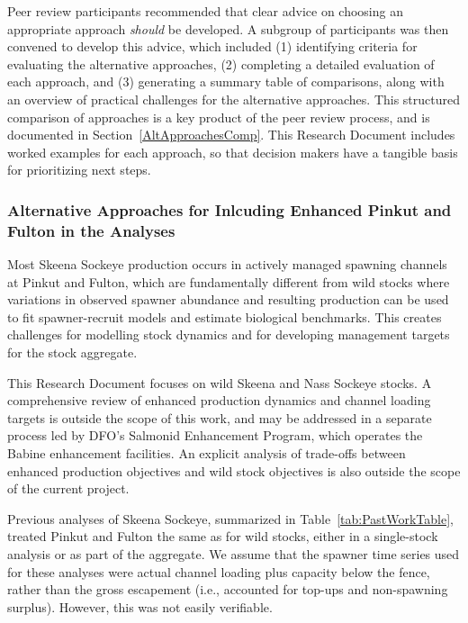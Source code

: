 \documentclass[french,11pt]{book}
\begin{document}
Peer review participants recommended that clear advice on choosing an appropriate approach \emph{should} be developed. A subgroup of participants was then convened to develop this advice, which included (1) identifying criteria for evaluating the alternative approaches, (2) completing a detailed evaluation of each approach, and (3) generating a summary table of comparisons, along with an overview of practical challenges for the alternative approaches. This structured comparison of approaches is a key product of the peer review process, and is documented in Section~\ref{AltApproachesComp}. This Research Document includes worked examples for each approach, so that decision makers have a tangible basis for prioritizing next steps.

\subsubsection{Alternative Approaches for Inlcuding Enhanced Pinkut and Fulton in the Analyses}\label{AltApproachEnhanced}

Most Skeena Sockeye production occurs in actively managed spawning channels at Pinkut and Fulton, which are fundamentally different from wild stocks where variations in observed spawner abundance and resulting production can be used to fit spawner-recruit models and estimate biological benchmarks. This creates challenges for modelling stock dynamics and for developing management targets for the stock aggregate.

This Research Document focuses on wild Skeena and Nass Sockeye stocks. A comprehensive review of enhanced production dynamics and channel loading targets is outside the scope of this work, and may be addressed in a separate process led by DFO's Salmonid Enhancement Program, which operates the Babine enhancement facilities. An explicit analysis of trade-offs between enhanced production objectives and wild stock objectives is also outside the scope of the current project.

Previous analyses of Skeena Sockeye, summarized in Table~\ref{tab:PastWorkTable}, treated Pinkut and Fulton the same as for wild stocks, either in a single-stock analysis or as part of the aggregate. We assume that the spawner time series used for these analyses were actual channel loading plus capacity below the fence, rather than the gross escapement (i.e., accounted for top-ups and non-spawning surplus). However, this was not easily verifiable.
\end{document}
